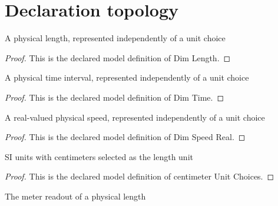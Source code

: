 \section{Declaration topology}
\begin{definition}
  \label{def:physics:phyx-mini-0107:phyxminiproblems-problemphyxmini0107-dimlength}
  A physical length, represented independently of a unit choice
\end{definition}
\begin{proof}
  This is the declared model definition of Dim Length.
\end{proof}
\begin{definition}
  \label{def:physics:phyx-mini-0107:phyxminiproblems-problemphyxmini0107-dimtime}
  A physical time interval, represented independently of a unit choice
\end{definition}
\begin{proof}
  This is the declared model definition of Dim Time.
\end{proof}
\begin{definition}
  \label{def:physics:phyx-mini-0107:phyxminiproblems-problemphyxmini0107-dimspeedreal}
  A real-valued physical speed, represented independently of a unit choice
\end{definition}
\begin{proof}
  This is the declared model definition of Dim Speed Real.
\end{proof}
\begin{definition}
  \label{def:physics:phyx-mini-0107:phyxminiproblems-problemphyxmini0107-centimeterunitchoices}
  SI units with centimeters selected as the length unit
\end{definition}
\begin{proof}
  This is the declared model definition of centimeter Unit Choices.
\end{proof}
\begin{definition}
  \label{def:physics:phyx-mini-0107:phyxminiproblems-problemphyxmini0107-lengthinmeters}
  The meter readout of a physical length
\end{definition}
